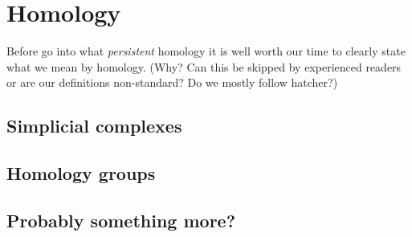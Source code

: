 \chapter{Homology}
Before go into what \textit{persistent} homology it is well worth our time to clearly state what we mean by homology. (Why? Can this be skipped by experienced readers or are our definitions non-standard? Do we mostly follow hatcher?)

\section{Simplicial complexes}

\section{Homology groups}

\section{Probably something more?}
